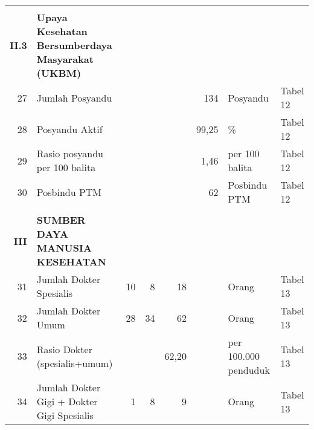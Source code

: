 \begin{small}
\begin{longtable}{rY{12em}rrrrY{5em}Y{5em}}
	 &                                                                                &        &        &                    &          &                                &          \\
	\textbf{II.3} & \textbf{Upaya Kesehatan Bersumberdaya Masyarakat (UKBM)}          &        &        &                    &          &                                &          \\
	 27 & Jumlah Posyandu                                                             &        &        &                    &      134 & Posyandu                       & Tabel 12 \\
	 28 & Posyandu Aktif                                                              &        &        &                    &    99,25 & \%                             & Tabel 12 \\
	 29 & Rasio posyandu per 100 balita                                               &        &        &                    &     1,46 & per 100 balita                 & Tabel 12 \\
	 30 & Posbindu PTM                                                                &        &        &                    &       62 & Posbindu PTM                   & Tabel 12 \\
	 &                                                                                &        &        &                    &          &                                &          \\
	\textbf{III} & \textbf{SUMBER DAYA MANUSIA KESEHATAN}                             &        &        &                    &          &                                &          \\
	 31 & Jumlah Dokter Spesialis                                                     &     10 &      8 &                 18 &          & Orang                          & Tabel 13 \\
	 32 & Jumlah Dokter Umum                                                          &     28 &     34 &                 62 &          & Orang                          & Tabel 13 \\
	 33 & Rasio Dokter (spesialis+umum)                                               &        &        &              62,20 &          & per 100.000 penduduk           & Tabel 13 \\
	 34 & Jumlah Dokter Gigi + Dokter Gigi Spesialis                                  &      1 &      8 &                  9 &          & Orang                          & Tabel 13 \\

\end{longtable}
\end{small}
